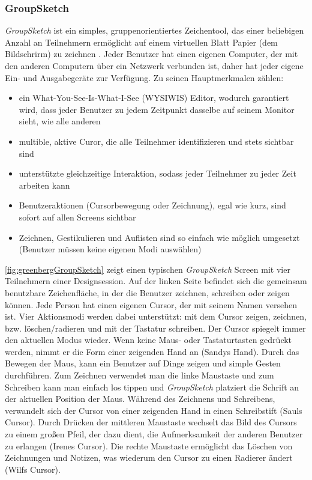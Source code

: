 \subsubsection{GroupSketch} 
\emph{GroupSketch} ist ein simples, gruppenorientiertes Zeichentool, das einer beliebigen Anzahl an Teilnehmern ermöglicht auf einem virtuellen Blatt Papier (dem Bildschrirm) zu zeichnen \citep{Greenberg:1991}. Jeder Benutzer hat einen eigenen Computer, der mit den anderen Computern über ein Netzwerk verbunden ist, daher hat jeder eigene Ein- und Ausgabegeräte zur Verfügung. Zu seinen Hauptmerkmalen zählen:
\begin{itemize}
	\item{ein What-You-See-Is-What-I-See (WYSIWIS) Editor, wodurch garantiert wird, dass jeder Benutzer zu jedem Zeitpunkt dasselbe auf seinem Monitor sieht, wie alle anderen}
	\item{multible, aktive Curor, die alle Teilnehmer identifizieren und stets sichtbar sind}
	\item{unterstützte gleichzeitige Interaktion, sodass jeder Teilnehmer zu jeder Zeit arbeiten kann}
	\item{Benutzeraktionen (Cursorbewegung oder Zeichnung), egal wie kurz, sind sofort auf allen Screens sichtbar}
	\item{Zeichnen, Gestikulieren und Auflisten sind so einfach wie möglich umgesetzt (Benutzer müssen keine eigenen Modi auswählen)}
\end{itemize}

\autoref{fig:greenbergGroupSketch} zeigt einen typischen \emph{GroupSketch} Screen mit vier Teilnehmern einer Designsession. Auf der linken Seite befindet sich die gemeinsam benutzbare Zeichenfläche, in der die Benutzer zeichnen, schreiben oder zeigen können. Jede Person hat einen eigenen Cursor, der mit seinem Namen versehen ist. 
Vier Aktionsmodi werden dabei unterstützt: mit dem Cursor zeigen, zeichnen, bzw. löschen/radieren und mit der Tastatur schreiben. Der Cursor spiegelt immer den aktuellen Modus wieder. Wenn keine Maus- oder Tastaturtasten gedrückt werden, nimmt er die Form einer zeigenden Hand an (Sandys Hand). Durch das Bewegen der Maus, kann ein Benutzer auf Dinge zeigen und simple Gesten durchführen. Zum Zeichnen verwendet man die linke Maustaste und zum Schreiben kann man einfach los tippen und \emph{GroupSketch} platziert die Schrift an der aktuellen Position der Maus. Während des Zeichnens und Schreibens, verwandelt sich der Cursor von einer zeigenden Hand in einen Schreibstift (Sauls Cursor). Durch Drücken der mittleren Maustaste wechselt das Bild des Cursors zu einem großen Pfeil, der dazu dient, die Aufmerksamkeit der anderen Benutzer zu erlangen (Irenes Cursor). Die rechte Maustaste ermöglicht das Löschen von Zeichnungen und Notizen, was wiederum den Cursor zu einen Radierer ändert (Wilfs Cursor).

